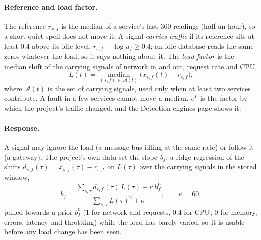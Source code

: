 \paragraph{Reference and load factor.} The reference $r_{s,f}$ is the median of a service's last $360$ readings (half an hour), so a short quiet spell does not move it. A signal \emph{carries traffic} if its reference sits at least $0.4$ above its idle level, $r_{s,f} - \log u_f \ge 0.4$; an idle database reads the same zeros whatever the load, so it says nothing about it. The \emph{load factor} is the median shift of the carrying signals of network in and out, request rate and CPU,
\begin{equation}
L(t) = \operatorname*{median}_{(s,f)\,\in\,\mathcal A(t)} \bigl( x_{s,f}(t) - r_{s,f} \bigr),
\label{eq:load}
\end{equation}
where $\mathcal A(t)$ is the set of carrying signals, used only when at least two services contribute. A fault in a few services cannot move a median. $e^{L}$ is the factor by which the project's traffic changed, and the Detection engines page shows it.

\paragraph{Response.} A signal may ignore the load (a message bus idling at the same rate) or follow it (a gateway). The project's own data set the slope $b_f$: a ridge regression of the shifts $d_{s,f}(\tau) = x_{s,f}(\tau) - r_{s,f}$ on $L(\tau)$ over the carrying signals in the stored window,
\begin{equation}
b_f = \frac{\sum_{s,\tau} d_{s,f}(\tau)\,L(\tau) + \kappa\, b^{0}_f}{\sum_{s,\tau} L(\tau)^2 + \kappa},\qquad \kappa = 60,
\end{equation}
pulled towards a prior $b^0_f$ ($1$ for network and requests, $0.4$ for CPU, $0$ for memory, errors, latency and throttling) while the load has barely varied, so it is usable before any load change has been seen.

